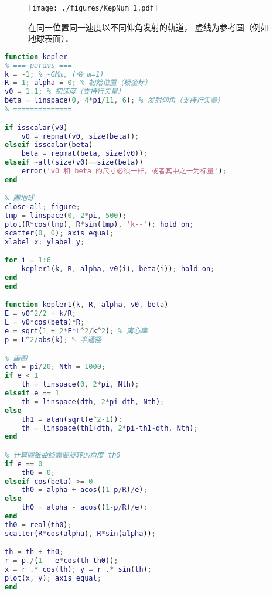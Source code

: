 
\begin{issues}
\issueDraft
{}
\end{issues}


\begin{figure}[ht]
\centering
\texttt{[image: ./figures/KepNum\_1.pdf]}
\caption{在同一位置同一速度以不同仰角发射的轨道， 虚线为参考圆（例如地球表面）．} \label{KepNum_fig1}
\end{figure}

\begin{lstlisting}[language=matlab]
% 已知初始位置、发射速度、发射方向， 求轨道以及运动方程
function kepler
% === params ===
k = -1; % -GMm, (令 m=1)
R = 1; alpha = 0; % 初始位置（极坐标）
v0 = 1.1; % 初速度（支持行矢量）
beta = linspace(0, 4*pi/11, 6); % 发射仰角（支持行矢量）
% ==============

if isscalar(v0)
    v0 = repmat(v0, size(beta));
elseif isscalar(beta)
    beta = repmat(beta, size(v0));
elseif ~all(size(v0)==size(beta))
    error('v0 和 beta 的尺寸必须一样，或者其中之一为标量');
end

% 画地球
close all; figure;
tmp = linspace(0, 2*pi, 500);
plot(R*cos(tmp), R*sin(tmp), 'k--'); hold on;
scatter(0, 0); axis equal;
xlabel x; ylabel y;

for i = 1:6
    kepler1(k, R, alpha, v0(i), beta(i)); hold on;
end
end

function kepler1(k, R, alpha, v0, beta)
E = v0^2/2 + k/R;
L = v0*cos(beta)*R;
e = sqrt(1 + 2*E*L^2/k^2); % 离心率
p = L^2/abs(k); % 半通径

% 画图
dth = pi/20; Nth = 1000;
if e < 1
    th = linspace(0, 2*pi, Nth);
elseif e == 1
    th = linspace(dth, 2*pi-dth, Nth);
else
    th1 = atan(sqrt(e^2-1));
    th = linspace(th1+dth, 2*pi-th1-dth, Nth);
end

% 计算圆锥曲线需要旋转的角度 th0
if e == 0
    th0 = 0;
elseif cos(beta) >= 0
    th0 = alpha + acos((1-p/R)/e);
else
    th0 = alpha - acos((1-p/R)/e);
end
th0 = real(th0);
scatter(R*cos(alpha), R*sin(alpha));

th = th + th0;
r = p./(1 - e*cos(th-th0));
x = r .* cos(th); y = r .* sin(th);
plot(x, y); axis equal;
end
\end{lstlisting}
